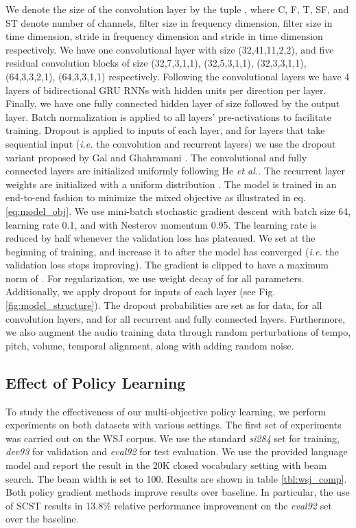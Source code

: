 \documentclass{article}
\newcommand{\ie}{\emph{i.e.}\xspace}
\newcommand{\etal}{\emph{et al.}\xspace}
\begin{document}
We denote the size of the convolution layer by the tuple , where C, F, T, SF, and ST denote number of channels, filter size in frequency dimension, filter size in time dimension, stride in frequency dimension and stride in time dimension respectively. We have one convolutional layer with size (32,41,11,2,2), and five residual convolution blocks of size (32,7,3,1,1), (32,5,3,1,1), (32,3,3,1,1), (64,3,3,2,1), (64,3,3,1,1) respectively. Following
the convolutional layers we have 4 layers of bidirectional GRU RNNs with  hidden units per direction per layer. Finally, we have one fully connected hidden layer
of size  followed by the output layer. Batch normalization \cite{bn} is applied to all layers' pre-activations to facilitate training. 
Dropout \cite{dropout} is applied to inputs of each layer, and for layers that take sequential input (\ie the convolution and recurrent layers) we use the dropout variant proposed by Gal and Ghahramani \cite{gal2016theoretically}. The convolutional and fully connected layers are initialized uniformly following He \etal \cite{he2015delving}. The recurrent layer weights are initialized with a uniform distribution . The model is trained in an end-to-end fashion to minimize the mixed objective as illustrated in eq. \ref{eq:model_obj}. We use mini-batch stochastic gradient descent with batch size 64, learning rate 0.1, and with Nesterov momentum 0.95. The learning rate is reduced by half whenever the validation loss has plateaued. 
We set  at the beginning of training, and increase it to  after the model has converged (\ie the validation loss stops improving). 
The gradient is clipped \cite{pascanu2013difficulty} to have a maximum  norm of .
For regularization, we use  weight decay of  for all 
parameters. Additionally, we apply dropout for inputs of each layer (see Fig. \ref{fig:model_structure}). The dropout probabilities are set as  for data,  for all convolution layers, and  for all recurrent and fully connected layers. Furthermore, we also augment the audio training data through random perturbations of tempo, pitch, volume, temporal alignment, along with adding random noise. 


\subsection{Effect of Policy Learning}
To study the effectiveness of our multi-objective policy learning, we perform experiments on both datasets with various settings. The first set of experiments was carried out on the WSJ corpus. We use the standard \emph{si284} set for training, \emph{dev93} for validation and \emph{eval92} for test evaluation. We use the provided language model and report the result in the 20K closed vocabulary setting with beam search. The beam width is set to 100. Results are shown in table \ref{tbl:wsj_comp}. Both policy gradient methods improve results over baseline. In particular, the use of SCST results in 13.8\% relative performance improvement on the \emph{eval92} set over the baseline.
\end{document}
